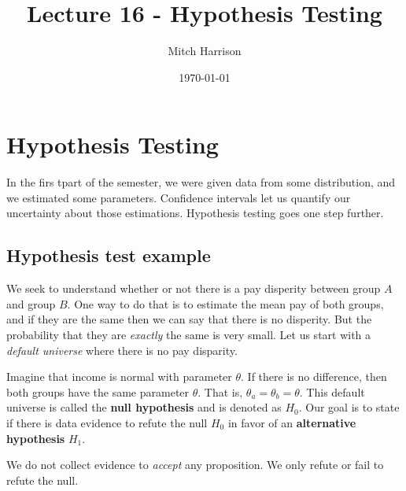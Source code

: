 \documentclass[titlepage, 12pt, leqno]{article}
\title{\Huge{Lecture 16 - Hypothesis Testing}}
\author{\large{Mitch Harrison}}
\date{\today}
\begin{document}
\setlength{\parskip}{1\baselineskip}
\setlength{\parindent}{15pt}
\maketitle
\tableofcontents
\newpage


\section{Hypothesis Testing}

In the firs tpart of the semester, we were given data from some distribution,
and we estimated some parameters. Confidence intervals let us quantify our 
uncertainty about those estimations. Hypothesis testing goes one step further.

\subsection{Hypothesis test example}
We seek to understand whether or not there is a pay disperity between group
$A$ and group $B$. One way to do that is to estimate the mean pay of both
groups, and if they are the same then we can say that there is no disperity.
But the probability that they are \textit{exactly} the same is very small.
Let us start with a \textit{default universe} where there is no pay disparity.

Imagine that income is normal with parameter $\theta$. If there is no difference,
then both groups have the same parameter $\theta$. That is,
$\theta_{a} = \theta_{b} = \theta$. This default universe is called the
\textbf{null hypothesis} and is denoted as $H_{0}$. Our goal is to state if there
is data evidence to refute the null $H_{0}$ in favor of an \textbf{alternative
hypothesis} $H_{1}$.

\begin{note}
    We do not collect evidence to \textit{accept} any proposition. We only 
    refute or fail to refute the null.
\end{note}
\end{document}
